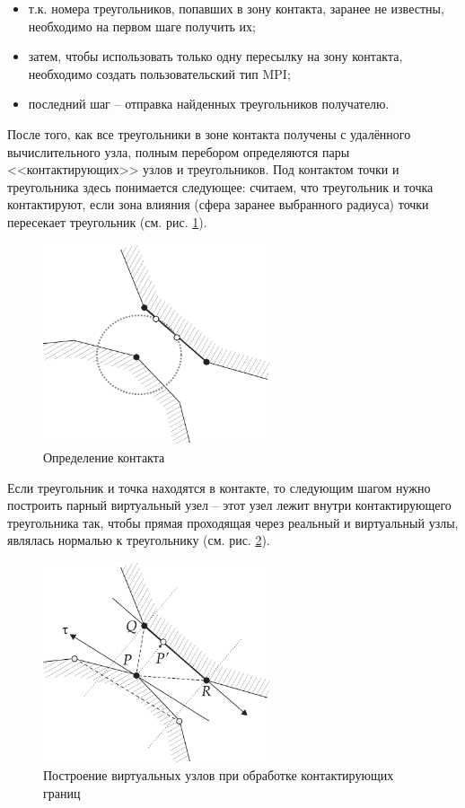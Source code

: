 \begin{itemize}
	\item т.к. номера треугольников, попавших в зону контакта, заранее не известны, необходимо на первом шаге получить их;
	\item затем, чтобы использовать только одну пересылку на зону контакта, необходимо создать пользовательский тип MPI;
	\item последний шаг -- отправка найденных треугольников получателю.
\end{itemize}
После того, как все треугольники в зоне контакта получены с удалённого вычислительного узла, полным перебором определяются пары <<контактирующих>> узлов и треугольников. Под контактом точки и треугольника здесь понимается следующее: считаем, что треугольник и точка контактируют, если зона влияния (сфера заранее выбранного радиуса) точки пересекает треугольник (см. рис. \ref{pic:contact_detection}).
\begin{figure}[htp]
\centering
\includegraphics[width=0.6\textwidth]{pdf/contact_detection.pdf}
\caption{Определение контакта}
\label{pic:contact_detection}
\end{figure}
Если треугольник и точка находятся в контакте, то следующим шагом нужно построить парный виртуальный узел -- этот узел лежит внутри контактирующего треугольника так, чтобы прямая проходящая через реальный и виртуальный узлы, являлась нормалью к треугольнику (см. рис. \ref{pic:contact_processing}).
\begin{figure}[htp]
\centering
\includegraphics[width=0.6\textwidth]{pdf/contact_processing.pdf}
\caption{Построение виртуальных узлов при обработке контактирующих границ}
\label{pic:contact_processing}
\end{figure}
